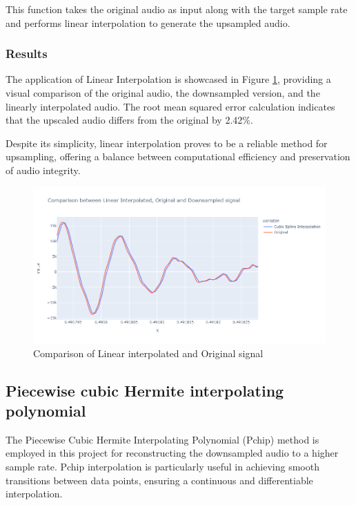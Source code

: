 \documentclass{article}
\begin{document}
This function takes the original audio as input along with the target sample rate and performs linear interpolation to generate the upsampled audio.

\subsubsection{Results}

The application of Linear Interpolation is showcased in Figure \ref{fig:linear_interpolation}, providing a visual comparison of the original audio, the downsampled version, and the linearly interpolated audio. The root mean squared error calculation indicates that the upscaled audio differs from the original by 2.42\%.\cite{wiki_rmsd}

Despite its simplicity, linear interpolation proves to be a reliable method for upsampling, offering a balance between computational efficiency and preservation of audio integrity.

\begin{figure}[h]
    \centering
    \includegraphics[width=\textwidth]{Linear.png}
    \caption{Comparison of Linear interpolated and Original signal}
    \label{fig:linear_interpolation}
\end{figure}



\newpage
\subsection{Piecewise cubic Hermite interpolating polynomial}
The Piecewise Cubic Hermite Interpolating Polynomial (Pchip) method is employed in this project for reconstructing the downsampled audio to a higher sample rate. Pchip interpolation is particularly useful in achieving smooth transitions between data points, ensuring a continuous and differentiable interpolation. \\
\end{document}
